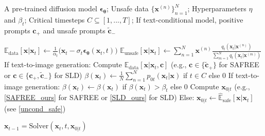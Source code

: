 \begin{algorithm}[!tb]
  \caption{Training-Free Safe Denoiser}
  \label{algo:safer}
  \begin{algorithmic}
    A pre-trained diffusion model $\bm{\epsilon}_{\bm{\theta}}$; Unsafe data $\{\mathbf{x}^{(n)}\}_{n=1}^{N}$; Hyperparameters $\eta$ and $\beta_{t}$; Critical timesteps $C\subseteq[1,...,T]$; If text-conditional model, positive prompts $\mathbf{c}_{+}$ and unsafe prompts $\tilde{\mathbf{c}}_{-}$
    \vspace{.1cm} 
    
    \STATE $\mathbb{E}_{\text{data}}[\mathbf{x}\vert\mathbf{x}_{t}]\leftarrow \frac{1}{\alpha_{t}}\big(\mathbf{x}_{t}-\sigma_{t}\bm{\epsilon}_{\bm{\theta}}(\mathbf{x}_{t},t)\big)$
        \STATE $\mathbb{E}_{\text{unsafe}}[\mathbf{x}\vert\mathbf{x}_{t}]\leftarrow \sum_{n=1}^{N}\mathbf{x}^{(n)}\frac{q_{t}(\mathbf{x}_{t}\vert\mathbf{x}^{(n)})}{\sum_{m=1}^{N}q_{t}(\mathbf{x}_{t}\vert\mathbf{x}^{(m)})}$
    \STATE If text-to-image generation:
    \STATE \quad\quad Compute $\mathbb{E}_{\text{data}}[\mathbf{x}\vert\mathbf{x}_{t},\mathbf{c}]$ (e.g., $\mathbf{c}\in\{\tilde{\mathbf{c}}_{+}\}$ for SAFREE or $\mathbf{c}\in\{\mathbf{c}_{+},\tilde{\mathbf{c}}_{-}\}$ for SLD)%
    \STATE $\beta(\mathbf{x}_{t})\leftarrow\frac{1}{N}\sum_{n=1}^{N} p_{0t}(\mathbf{x}_{t}\vert\mathbf{x})$ if $t\in C$ else 0
    \STATE If text-to-image generation:
    \STATE \quad \quad  $\beta(\mathbf{x}_{t})\leftarrow\beta(\mathbf{x}_{t})$ if $\beta(\mathbf{x}_{t})>\beta_{t}$ else 0
    \STATE \quad \quad Compute $\mathbf{x}_{0\vert t}$ (e.g., \eqref{SAFREE_ours} for SAFREE or \eqref{SLD_ours} for SLD)
    \STATE Else:
        \STATE \quad \quad $\mathbf{x}_{0\vert t}\leftarrow\hat{\mathbb{E}}_{\text{safe}}[\mathbf{x}\vert\mathbf{x}_{t}]$ (see \eqref{uncond_safe})
    
    \STATE $\mathbf{x}_{t-1}=\text{Solver}(\mathbf{x}_{t},t,\mathbf{x}_{0\vert t})$
    \ENDFOR 
  \end{algorithmic}
\end{algorithm}